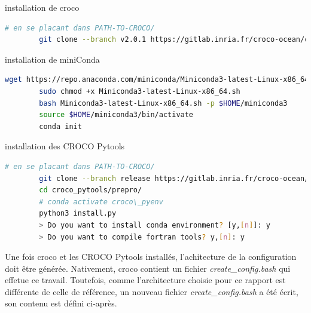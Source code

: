 \documentclass[10pt,a4paper,titlepage]{article}
\begin{document}
\begin{codeEnv}{installation de croco}
    \begin{lstlisting}[language=bash]
        # en se placant dans PATH-TO-CROCO/
        git clone --branch v2.0.1 https://gitlab.inria.fr/croco-ocean/croco.git croco-v2.0.1
    \end{lstlisting}
\end{codeEnv}

\begin{codeEnv}{installation de miniConda}
    \begin{lstlisting}[language=bash]
        wget https://repo.anaconda.com/miniconda/Miniconda3-latest-Linux-x86_64.sh
        sudo chmod +x Miniconda3-latest-Linux-x86_64.sh
        bash Miniconda3-latest-Linux-x86_64.sh -p $HOME/miniconda3
        source $HOME/miniconda3/bin/activate
        conda init
    \end{lstlisting}
\end{codeEnv}

\begin{codeEnv}{installation des CROCO Pytools}
    \begin{lstlisting}[language=bash]
        # en se placant dans PATH-TO-CROCO/
        git clone --branch release https://gitlab.inria.fr/croco-ocean/croco_pytools.git
        cd croco_pytools/prepro/
        # conda activate croco\_pyenv
        python3 install.py
        > Do you want to install conda environment? [y,[n]]: y
        > Do you want to compile fortran tools? y,[n]: y
    \end{lstlisting}
\end{codeEnv}

Une fois croco et les CROCO Pytools installés, l'achitecture de la configuration doit être générée. Nativement, croco contient un fichier \textit{create\_config.bash} qui effetue ce travail. Toutefois, comme l'architecture choisie pour ce rapport est différente de celle de référence, un nouveau fichier \textit{create\_config.bash} a été écrit, son contenu est défini ci-après.
\end{document}
